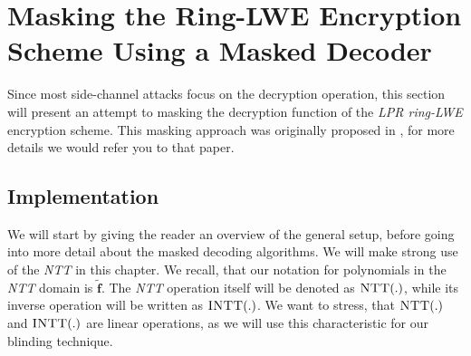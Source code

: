 %
%

\chapter{Masking the Ring-LWE Encryption Scheme Using a Masked Decoder}
Since most side-channel attacks focus on the decryption operation, this section will present an attempt to masking the decryption function of the \textit{\ac{LPR} \ac{ring-LWE}} encryption scheme. This masking approach was originally proposed in \cite{maskedRing}, for more details we would refer you to that paper.

\section{Implementation}
We will start by giving the reader an overview of the general setup, before going into more detail about the masked decoding algorithms. We will make strong use of the \textit{\ac{NTT}} in this chapter. We recall, that our notation for polynomials in the \textit{\ac{NTT}} domain is \(\tilde{\textbf{f}}\). The \textit{\ac{NTT}} operation itself will be denoted as \(\textsc{NTT}(.)\), while its inverse operation will be written as \(\textsc{INTT}(.)\). We want to stress, that \(\textsc{NTT}(.)\) and \(\textsc{INTT}(.)\) are linear operations, as we will use this characteristic for our blinding technique.

